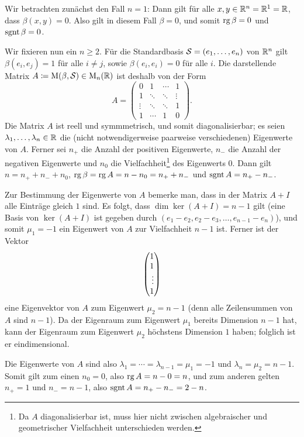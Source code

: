 \section{}

Wir betrachten zunächst den Fall $n = 1$:
Dann gilt für alle $x, y \in \mathbb{R}^n = \mathbb{R}^1 = \mathbb{R}$, dass $\beta(x,y) = 0$.
Also gilt in diesem Fall $\beta = 0$, und somit $\operatorname{rg} \beta = 0$ und $\operatorname{sgnt} \beta = 0$.

Wir fixieren nun ein $n \geq 2$.
Für die Standardbasis $\mathcal{S} = (e_1, \dotsc, e_n)$ von $\mathbb{R}^n$ gilt $\beta(e_i, e_j) = 1$ für alle $i \neq j$, sowie $\beta(e_i, e_i) = 0$ für alle $i$.
Die darstellende Matrix $A \coloneqq \operatorname{M}(\beta, \mathcal{S}) \in \operatorname{M}_{n}(\mathbb{R})$ ist deshalb von der Form
\[
    A
  = \begin{pmatrix}
      0       & 1       & \cdots  & 1       \\
      1       & \ddots  & \ddots  & \vdots  \\
      \vdots  & \ddots  & \ddots  & 1       \\
      1       & \cdots  & 1       & 0
    \end{pmatrix}.
\]
Die Matrix $A$ ist reell und symmmetrisch, und somit diagonalisierbar;
es seien $\lambda_1, \dotsc, \lambda_n \in \mathbb{R}$ die (nicht notwendigerweise paarweise verschiedenen) Eigenwerte von $A$.
Ferner sei $n_+$ die Anzahl der positiven Eigenwerte, $n_-$ die Anzahl der negativen Eigenwerte und $n_0$ die Vielfachheit\footnote{Da $A$ diagonalisierbar ist, muss hier nicht zwischen algebraischer und geometrischer Vielfachheit unterschieden werden.} des Eigenwerts $0$.
Dann gilt $n = n_+ + n_- + n_0$, $\operatorname{rg} \beta = \operatorname{rg} A = n - n_0 = n_+ + n_-$ und $\operatorname{sgnt} A = n_+ - n_-$.

Zur Bestimmung der Eigenwerte von $A$ bemerke man, dass in der Matrix $A + I$ alle Einträge gleich $1$ sind.
Es folgt, dass $\dim \ker (A + I) = n - 1$ gilt (eine Basis von $\ker (A + I)$ ist gegeben durch $(e_1 - e_2, e_2 - e_3, \dotsc, e_{n-1} - e_n)$), und somit $\mu_1 = -1$ ein Eigenwert von $A$ zur Vielfachheit $n-1$ ist.
Ferner ist der Vektor
\[
  \vect{1 \\ 1 \\ \vdots \\ 1}
\]
eine Eigenvektor von $A$ zum Eigenwert $\mu_2 = n-1$ (denn alle Zeilensummen von $A$ sind $n-1$).
Da der Eigenraum zum Eigenwert $\mu_1$ bereits Dimension $n-1$ hat, kann der Eigenraum zum Eigenwert $\mu_2$ höchstens Dimension $1$ haben;
folglich ist er eindimensional.

Die Eigenwerte von $A$ sind also $\lambda_1 = \dotsb = \lambda_{n-1} = \mu_1 = -1$ und $\lambda_n = \mu_2 = n-1$.
Somit gilt zum einen $n_0 = 0$, also $\operatorname{rg} A = n - 0 = n$, und zum anderen gelten $n_+ = 1$ und $n_- = n-1$, also $\operatorname{sgnt} A = n_+ - n_- = 2 - n$.
